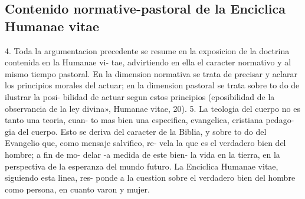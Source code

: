 \documentclass[letterpaper]{report}
\begin{document}
		\subsection{Contenido normative-pastoral de la Enciclica Humanae vitae}
			4. Toda la argumentacion precedente se resume en 
			la exposicion de la doctrina contenida en la Humanae vi- 
			tae, advirtiendo en ella el caracter normativo y al mismo 
			tiempo pastoral. En la dimension normativa se trata de 
			precisar y aclarar los principios morales del actuar; en la 
			dimension pastoral se trata sobre to do de ilustrar la posi- 
			bilidad de actuar segun estos principios (eposibilidad de la 
			observancia de la ley divina», Humanae vitae, 20). 
			5. La teologia del cuerpo no es tanto una teoria, cuan- 
			to mas bien una especifica, evangelica, cristiana pedago- 
			gia del cuerpo. Esto se deriva del caracter de la Biblia, y 
			sobre to do del Evangelio que, como mensaje salvifico, re- 
			vela la que es el verdadero bien del hombre; a fin de mo- 
			delar -a medida de este bien- la vida en la tierra, en la 
			perspectiva de la esperanza del mundo futuro. 
			La Enciclica Humanae vitae, siguiendo esta linea, res- 
			ponde a la cuestion sobre el verdadero bien del hombre 
			como persona, en cuanto varon y mujer.
	
\end{document}
